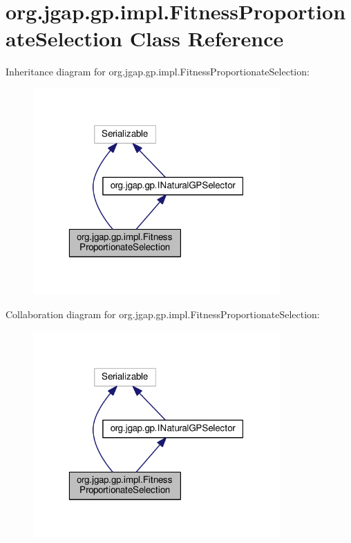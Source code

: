 \hypertarget{classorg_1_1jgap_1_1gp_1_1impl_1_1_fitness_proportionate_selection}{\section{org.\-jgap.\-gp.\-impl.\-Fitness\-Proportionate\-Selection Class Reference}
\label{classorg_1_1jgap_1_1gp_1_1impl_1_1_fitness_proportionate_selection}
}


Inheritance diagram for org.\-jgap.\-gp.\-impl.\-Fitness\-Proportionate\-Selection\-:
\nopagebreak
\begin{figure}[H]
\begin{center}
\leavevmode
\includegraphics[width=268pt]{classorg_1_1jgap_1_1gp_1_1impl_1_1_fitness_proportionate_selection__inherit__graph}
\end{center}
\end{figure}


Collaboration diagram for org.\-jgap.\-gp.\-impl.\-Fitness\-Proportionate\-Selection\-:
\nopagebreak
\begin{figure}[H]
\begin{center}
\leavevmode
\includegraphics[width=268pt]{classorg_1_1jgap_1_1gp_1_1impl_1_1_fitness_proportionate_selection__coll__graph}
\end{center}
\end{figure}
